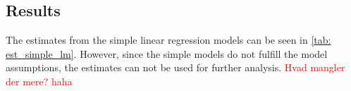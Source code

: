 \subsection{Results}
The estimates from the simple linear regression models can be seen in \cref{tab: est_simple_lm}. However, since the simple models do not fulfill the model assumptions, the estimates can not be used for further analysis. \textcolor{red}{Hvad mangler der mere? haha}

